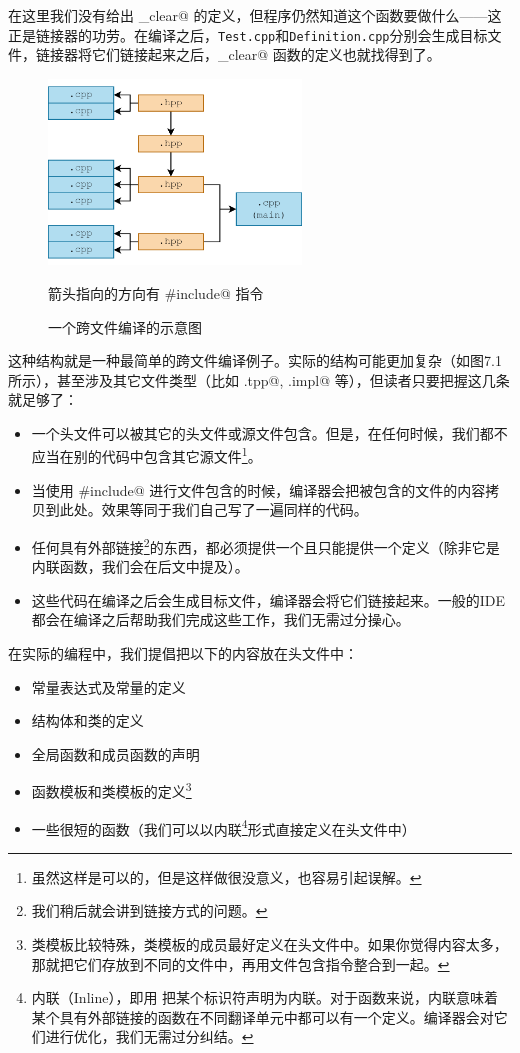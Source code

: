 在这里我们没有给出 \lstinline@input_clear@ 的定义，但程序仍然知道这个函数要做什么——这正是链接器的功劳。在编译之后，\texttt{Test.cpp}和\texttt{Definition.cpp}分别会生成目标文件，链接器将它们链接起来之后，\lstinline@input_clear@ 函数的定义也就找得到了。\par
\begin{figure}[htbp]
    \centering
    \includegraphics[width=0.6\textwidth]{../images/generalized_parts/07_separate_compilation.drawio.png}
    \caption{一个跨文件编译的示意图}
    \footnotesize{箭头指向的方向有 \lstinline@#include@ 指令}
\end{figure}
这种结构就是一种最简单的跨文件编译例子。实际的结构可能更加复杂（如图7.1所示），甚至涉及其它文件类型（比如 \lstinline@.tpp@, \lstinline@.impl@ 等），但读者只要把握这几条就足够了：
\begin{itemize}
    \item 一个头文件可以被其它的头文件或源文件包含。但是，在任何时候，我们都不应当在别的代码中包含其它源文件\footnote{虽然这样是可以的，但是这样做很没意义，也容易引起误解。}。
    \item 当使用 \lstinline@#include@ 进行文件包含的时候，编译器会把被包含的文件的内容拷贝到此处。效果等同于我们自己写了一遍同样的代码。
    \item 任何具有外部链接\footnote{我们稍后就会讲到链接方式的问题。}的东西，都必须提供一个且只能提供一个定义（除非它是内联函数，我们会在后文中提及）。
    \item 这些代码在编译之后会生成目标文件，编译器会将它们链接起来。一般的IDE都会在编译之后帮助我们完成这些工作，我们无需过分操心。
\end{itemize}\par
在实际的编程中，我们提倡把以下的内容放在头文件中：
\begin{itemize}
    \item 常量表达式及常量的定义
    \item 结构体和类的定义
    \item 全局函数和成员函数的声明
    \item 函数模板和类模板的定义\footnote{类模板比较特殊，类模板的成员最好定义在头文件中。如果你觉得内容太多，那就把它们存放到不同的文件中，再用文件包含指令整合到一起。}
    \item 一些很短的函数（我们可以以内联\footnote{内联（Inline），即用 \lstinline@inline@ 把某个标识符声明为内联。对于函数来说，内联意味着某个具有外部链接的函数在不同翻译单元中都可以有一个定义。编译器会对它们进行优化，我们无需过分纠结。}形式直接定义在头文件中）
\end{itemize}
